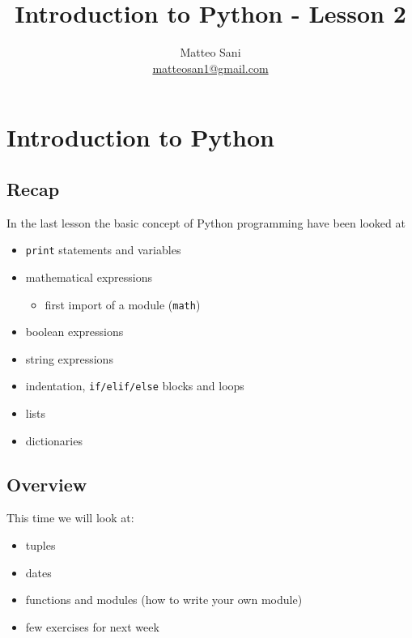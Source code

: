 \documentclass[11pt]{article}
\title{Introduction to Python - Lesson 2}
\author{Matteo Sani \\ \href{mailto:matteosan1@gmail.com}{matteosan1@gmail.com}}
\providecommand{\tightlist}{%
      \setlength{\itemsep}{0pt}\setlength{\parskip}{0pt}}
\begin{document}
    
    
    \maketitle
    
    

    
    \hypertarget{introduction-to-python---lesson-2}{%
\section{Introduction to Python}\label{introduction-to-python---lesson-2}}

\hypertarget{recap}{%
\subsection{Recap}\label{recap}}

In the last lesson the basic concept of Python programming have been
looked at

\begin{itemize}
\tightlist
\item
  \texttt{print} statements and variables
\item
  mathematical expressions

  \begin{itemize}
  \tightlist
  \item
    first import of a module (\texttt{math})
  \end{itemize}
\item
  boolean expressions
\item
  string expressions
\item
  indentation, \texttt{if/elif/else} blocks and loops
\item
  lists
\item
  dictionaries
\end{itemize}

\hypertarget{overview}{%
\subsection{Overview}\label{overview}}

This time we will look at:

\begin{itemize}
\tightlist
\item
  tuples
\item
  dates
\item
  functions and modules (how to write your own module)
\item
  few exercises for next week
\end{itemize}
\end{document}
